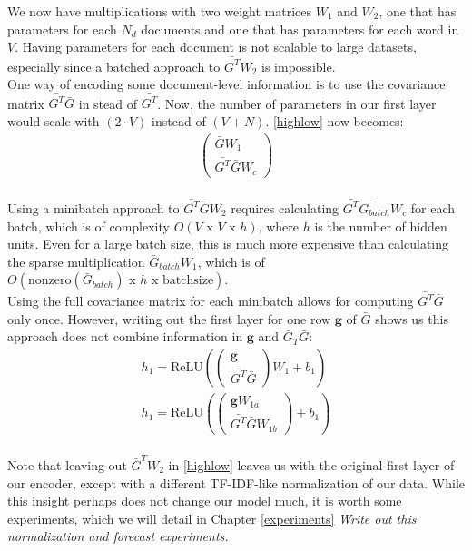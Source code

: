 \documentclass{report}
\begin{document}
We now have multiplications with two weight matrices $W_1$ and $W_2$, one that has parameters for each $N_d$ documents and one that has parameters for each word in $V$. Having parameters for each document is not scalable to large datasets, especially since a batched approach to $\bar{G^T}W_2$ is impossible.\\
One way of encoding some document-level information is to use the covariance matrix $\bar{G^T}\bar{G}$ in stead of $\bar{G^T}$. Now, the number of parameters in our first layer would scale with $(2\cdot V)$ instead of $(V+N)$. \ref{highlow} now becomes:
\\
\begin{align}
\left(\begin{matrix}
\bar{G}W_1 \\
\bar{G^T}\bar{G}W_c
\end{matrix}\right)
\end{align}
\\
Using a minibatch approach to $\bar{G^T}\bar{G}W_2$ requires calculating $\bar{G^T}\bar{G_{batch}}W_c$ for each batch, which is of complexity $O(V\text{ x }V \text{ x } h)$, where $h$ is the number of hidden units. Even for a large batch size, this is much more expensive than calculating the sparse multiplication $\bar{G}_{batch}W_1$, which is of $O(\text{nonzero}(\bar{G}_{batch}) \text{ x } h \text{ x } \text{batchsize})$. 
\\
Using the full covariance matrix for each minibatch allows for computing $\bar{G^T}\bar{G}$ only once. However, writing out the first layer for one row $\mathbf{g}$ of $\bar{G}$ shows us this approach does not combine information in $\mathbf{g}$ and $\bar{G}_T\bar{G}$:
\begin{align}
h_1 = \text{ReLU}(
\left(\begin{matrix}
\mathbf{g} \\
\bar{G^T}\bar{G}
\end{matrix}\right)W_1 +b_1)
\\
h_1 = 
\text{ReLU}(\left(\begin{matrix}
	\mathbf{g}W_{1a} \\
	\bar{G^T}\bar{G}W_{1b}
\end{matrix}\right) + b_1)
\end{align}
\\
Note that leaving out $\bar{G}^TW_2$ in \ref{highlow} leaves us with the original first layer of our encoder, except with a different TF-IDF-like normalization of our data. While this insight perhaps does not change our model much, it is worth some experiments, which we will detail in Chapter \ref{experiments}   \textit{Write out this normalization and forecast experiments.} 
\end{document}
